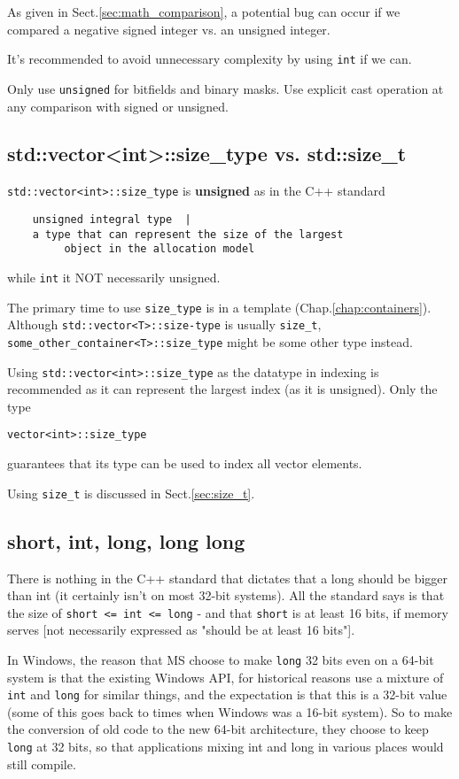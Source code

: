 As given in Sect.\ref{sec:math_comparison}, a potential bug can occur if we
compared a negative signed integer vs. an unsigned integer.

It's recommended to avoid unnecessary complexity by using \verb!int! if we can. 

Only use \verb!unsigned! for bitfields and binary masks. Use explicit cast
operation at any comparison with signed or unsigned.

\subsection{std::vector<int>::size\_type vs. std::size\_t}
\label{sec:size_type}

\verb!std::vector<int>::size_type! is {\bf unsigned} as in the C++ standard
\begin{verbatim}
    unsigned integral type  |  
    a type that can represent the size of the largest
         object in the allocation model
\end{verbatim}
while \verb!int! it NOT necessarily unsigned. 

The primary time to use \verb!size_type! is in a template
(Chap.\ref{chap:containers}). Although \verb!std::vector<T>::size-type! is
usually \verb!size_t!, \verb!some_other_container<T>::size_type! might be some
other type instead.

Using \verb!std::vector<int>::size_type! as the datatype in indexing is
recommended as it can represent the largest index (as it is unsigned).
Only the type
\begin{verbatim}
vector<int>::size_type
\end{verbatim}
guarantees that its type can be used to index all vector elements.

Using \verb!size_t! is discussed in Sect.\ref{sec:size_t}.


\subsection{short, int, long, long long}

There is nothing in the C++ standard that dictates that a long should be bigger
than int (it certainly isn't on most 32-bit systems). All the standard says is
that the size of \verb!short <= int <= long! - and that \verb!short! is at least
16 bits, if memory serves [not necessarily expressed as "should be at least 16
bits"].

In Windows, the reason that MS choose to make \verb!long! 32 bits even on a
64-bit system is that the existing Windows API, for historical reasons use a mixture of
\verb!int! and \verb!long! for similar things, and the expectation is that this
is a 32-bit value (some of this goes back to times when Windows was a 16-bit
system). So to make the conversion of old code to the new 64-bit architecture, they choose to
keep \verb!long! at 32 bits, so that applications mixing int and long in various
places would still compile.

